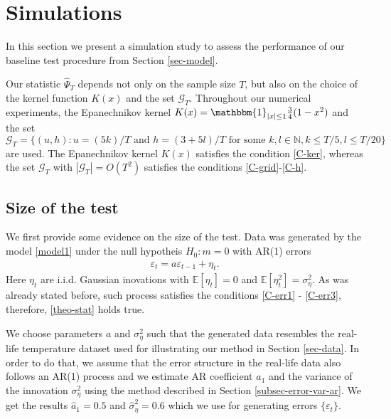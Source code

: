 
\section{Simulations}\label{sec-sim}
In this section we present a simulation study to assess the performance of our baseline test procedure from Section \ref{sec-model}.

Our statistic $\widehat{\Psi}_T$ depends not only on the sample size $T$, but also on the choice of the kernel function $K(x)$ and the set $\mathcal{G}_T$. Throughout our numerical experiments, the Epanechnikov kernel $K(x) = \mathbbm{1}_{|x|\leq 1} \frac{3}{4} (1 - x^2)$ and the set $\mathcal{G}_T = \{(u, h): u = (5k)/T \text{ and } h = (3+5l)/T \text{ for some } k, l \in \mathbb{N}, k \le T/5, l \le T/20\}$ are used. The Epanechnikov kernel $K(x)$ satisfies the condition \ref{C-ker}, whereas the set $\mathcal{G}_T$ with $|\mathcal{G}_T| = O(T^2)$ satisfies the conditions \ref{C-grid}-\ref{C-h}.


\subsection{Size of the test}\label{subsec-sim-size}
We first provide some evidence on the size of the test. Data was generated by the model \ref{model1} under the null hypotheis $H_0: m=0$ with AR(1) errors
\begin{align*}
\varepsilon_t = a \varepsilon_{t-1} + \eta_t.
\end{align*}
Here $\eta_t$ are i.i.d. Gaussian inovations with $\mathbb{E}[\eta_t] = 0$ and $\mathbb{E}[\eta_t^2] = \sigma_{\eta}^2$. As was already stated before, such process satisfies the conditions \ref{C-err1} - \ref{C-err3}, therefore, \ref{theo-stat} holds true.

We choose parameters $a$ and $ \sigma_{\eta}^2$ such that the generated data resembles the real-life temperature dataset used for illustrating our method in Section \ref{sec-data}. In order to do that, we assume that the error structure in the real-life data also follows an AR(1) process and we estimate AR coefficient $a_1$ and the variance of the innovation $\sigma_{\eta}^2$ using the method described in Section \ref{subsec-error-var-ar}. We get the results $\hat{a}_1 = 0.5$ and $\hat{\sigma}_{\eta}^2 = 0.6$ which we use for generating errors $\{\varepsilon_t\}$.

